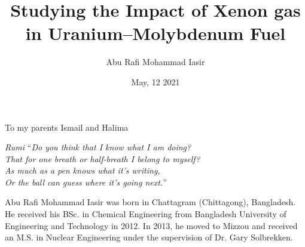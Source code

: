 \documentclass[hyper,dissertation]{MUthesis}
\title{Studying the Impact of Xenon gas in Uranium--Molybdenum Fuel}
\author{Abu Rafi Mohammad Iasir}
\date{May, 12 2021}
\begin{document}
\frontmatter   %
\maketitle     %
\copyrightpage %
\approvalpage  %

\begin{dedication}
To my parents Ismail and Halima 
\end{dedication}

\begin{epigraph}{\textit{Rumi}}
``\textit{Do you think that I know what I am doing? \\
  That for one breath or half-breath I belong to myself?\\
  As much as a pen knows what it's writing,\\
  Or the ball can guess where it's going next.}''
\end{epigraph}


\begin{acknowledgments}

\end{acknowledgments}


\tableofcontents
\listoftables

\listoffigures
\printnomenclature





\mainmatter %
















\appendix










\backmatter %
%
%

\begin{vita}
Abu Rafi Mohammad Iasir was born in Chattagram (Chittagong), Bangladesh. He received his BSc. in Chemical Engineering from Bangladesh University of Engineering and Technology in 2012. In 2013, he moved to Mizzou and received an M.S. in Nuclear Engineering under the supervision of Dr. Gary Solbrekken. 
\end{vita}
\end{document}
